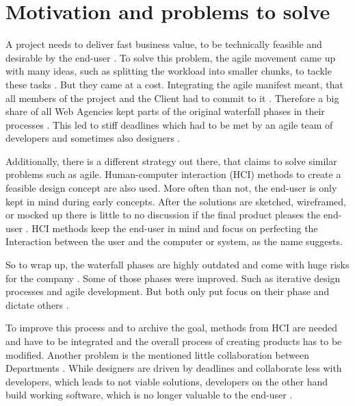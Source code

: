 \section*{Motivation and problems to solve}

A project needs to deliver fast business value, to be technically feasible and desirable by the end-user \citep{ratcliffe2011agile:11}. To solve this problem, the agile movement came up with many ideas, such as splitting the workload into smaller chunks, to tackle these tasks \citep{Theartof49:online}. But they came at a cost. Integrating the agile manifest meant, that all members of the project and the Client had to commit to it \citep{ratcliffe2011agile:11}. Therefore a big share of all Web Agencies kept parts of the original waterfall phases in their processes \citep{10spanne26:online}. This led to stiff deadlines which had to be met by an agile team of developers and sometimes also designers \citep{ratcliffe2011agile:4}.

Additionally, there is a different strategy out there, that claims to solve similar problems such as agile. Human-computer interaction (HCI) methods to create a feasible design concept are also used. \newline
More often than not, the end-user is only kept in mind during early concepts. After the solutions are sketched, wireframed, or mocked up there is little to no discussion if the final product pleases the end-user \citep{ratcliffe2011agile:33}. HCI methods keep the end-user in mind and focus on perfecting the Interaction between the user and the computer or system, as the name suggests. 

So to wrap up, the waterfall phases are highly outdated and come with huge risks for the company \citep{ratcliffe2011agile:14}. Some of those phases were improved. Such as iterative design processes and agile development. But both only put focus on their phase and dictate others \citep{ratcliffe2011agile:22}. 

To improve this process and to archive the goal, methods from HCI are needed and have to be integrated and the overall process of creating products has to be modified. Another problem is the mentioned little collaboration between Departments \citep{ratcliffe2011agile:fw}. While designers are driven by deadlines and collaborate less with developers, which leads to not viable solutions, developers on the other hand build working software, which is no longer valuable to the end-user \citep{ratcliffe2011agile:19,ratcliffe2011agile:33}. 


